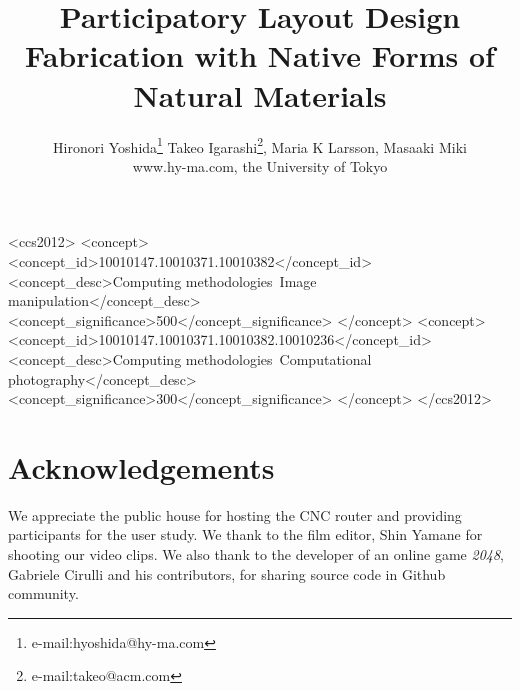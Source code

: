 \documentclass[review]{acmsiggraph}
\title{Participatory Layout Design Fabrication with Native Forms of Natural Materials}
\author{Hironori Yoshida\thanks{e-mail:hyoshida@hy-ma.com}   Takeo Igarashi\thanks{e-mail:takeo@acm.com}, Maria K Larsson, Masaaki Miki
 \\www.hy-ma.com, the University of Tokyo
}
\begin{document}



\maketitle


\linenumbers

%
%
\begin{CCSXML}
<ccs2012>
<concept>
<concept_id>10010147.10010371.10010382</concept_id>
<concept_desc>Computing methodologies~Image manipulation</concept_desc>
<concept_significance>500</concept_significance>
</concept>
<concept>
<concept_id>10010147.10010371.10010382.10010236</concept_id>
<concept_desc>Computing methodologies~Computational photography</concept_desc>
<concept_significance>300</concept_significance>
</concept>
</ccs2012>
\end{CCSXML}


\keywordlist

\conceptlist

\printcopyright








\section*{Acknowledgements}
We appreciate the public house for hosting the CNC router and providing participants for the user study.
We thank to the film editor, Shin Yamane for shooting our video clips.
We also thank to the developer of an online game \textit{2048}, Gabriele Cirulli and his contributors, for sharing source code in Github community.



\nocite{*}

\end{document}
